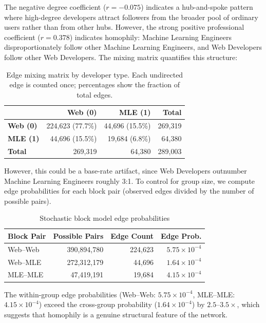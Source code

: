 \documentclass[letterpaper]{article}
\begin{document}
The negative degree coefficient ($r = -0.075$) indicates a hub-and-spoke pattern where high-degree developers attract followers from the broader pool of ordinary users rather than from other hubs. However, the strong positive professional coefficient ($r = 0.378$) indicates homophily: Machine Learning Engineers disproportionately follow other Machine Learning Engineers, and Web Developers follow other Web Developers. The mixing matrix quantifies this structure:

\begin{table}[H]
  \centering
  \begin{tabular}{l|rrr}
    \hline
    & \textbf{Web (0)} & \textbf{MLE (1)} & \textbf{Total} \\
    \hline
    \textbf{Web (0)} & 224,623 (77.7\%) & 44,696 (15.5\%) & 269,319 \\
    \textbf{MLE (1)} & 44,696 (15.5\%) & 19,684 (6.8\%) & 64,380 \\
    \hline
    \textbf{Total} & 269,319 & 64,380 & 289,003 \\
  \end{tabular}
  \caption{Edge mixing matrix by developer type. Each undirected edge is counted once; percentages show the fraction of total edges.}
  \label{tab:mixing}
\end{table}

However, this could be a base-rate artifact, since Web Developers outnumber Machine Learning Engineers roughly 3:1. To control for group size, we compute edge probabilities for each block pair (observed edges divided by the number of possible pairs).
\begin{table}[H]
  \centering
  \begin{tabular}{lrrr}
    \hline
    \textbf{Block Pair} & \textbf{Possible Pairs} & \textbf{Edge Count} & \textbf{Edge Prob.} \\
    \hline
    Web--Web & 390,894,780 & 224,623 & $5.75 \times 10^{-4}$ \\
    Web--MLE & 272,312,179 & 44,696 & $1.64 \times 10^{-4}$ \\
    MLE--MLE & 47,419,191 & 19,684 & $4.15 \times 10^{-4}$ \\
    \hline
  \end{tabular}
  \caption{Stochastic block model edge probabilities}
  \label{tab:sbm}
\end{table}

The within-group edge probabilities (Web--Web: $5.75 \times 10^{-4}$, MLE--MLE: $4.15 \times 10^{-4}$) exceed the cross-group probability ($1.64 \times 10^{-4}$) by $2.5$--$3.5\times$, which suggests that homophily is a genuine structural feature of the network.
\end{document}
